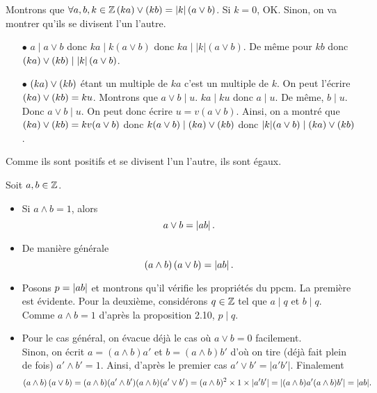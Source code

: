 \documentclass{magnolia}
\begin{document}
\begin{preuve}
Montrons que $\forall a,b,k\in\mathbb{Z}  \left(ka\right)\vee\left(kb\right)=\left|k\right|\left(a\vee b\right)$. Si $k=0$, OK. Sinon, on va montrer qu'ils se divisent l'un l'autre.
\begin{itemize}
\item[$\bullet$] $a\mid a\vee b$ donc $ka\mid k(a\vee b)$ donc $ka\mid |k|(a\vee b)$. De même pour $kb$ donc $\left(ka\right)\vee\left(kb\right)\mid \left|k\right|\left(a\vee b\right)$.
\item[$\bullet$] $\left(ka\right)\vee\left(kb\right)$ étant un multiple de $ka$ c'est un multiple de $k$. On peut l'écrire $\left(ka\right)\vee\left(kb\right)=ku$. Montrons que $a\vee b \mid u$. $ka\mid ku$ donc $a\mid u$. De même, $b\mid u$. Donc $a\vee b \mid u$. On peut donc écrire $u=v(a\vee b)$. Ainsi, on a montré que $\left(ka\right)\vee\left(kb\right)=kv(a\vee b)$ donc $k(a\vee b) \mid \left(ka\right)\vee\left(kb\right)$ donc $|k|(a\vee b) \mid \left(ka\right)\vee\left(kb\right)$.
\end{itemize}
Comme ils sont positifs et se divisent l'un l'autre, ils sont égaux.
\end{preuve}

\begin{proposition}
Soit $a,b\in\mathbb{Z}$.
\begin{itemize}
\item Si $a\wedge b=1$, alors
  \[a\vee b=\left|ab\right|.\]
\item De manière générale
  \[\left(a\wedge b\right)\left(a\vee b\right)=\left|ab\right|.\]
\end{itemize}
\end{proposition}

\begin{preuve}
\begin{itemize}
\item Posons $p=\left|ab\right|$ et montrons qu'il vérifie les propriétés du ppcm. La première est évidente. Pour la deuxième, considérons $q\in \mathbb{Z}$ tel que $a\mid q$ et $b\mid q$. Comme $a\wedge b=1$ d'après la proposition 2.10, $p\mid q$.
\item Pour le cas général, on évacue déjà le cas où $a\vee b=0$ facilement.\\
Sinon, on écrit $a=(a\wedge b)a'$ et $b=(a\wedge b)b'$ d'où on tire (déjà fait plein de fois) $a'\wedge b'=1$. Ainsi, d'après le premier cas $a'\vee b'=|a'b'|$. Finalement $$\left(a\wedge b\right)\left(a\vee b\right)=(a\wedge b)(a'\wedge b')(a\wedge b)(a'\vee b')=(a\wedge b)^2\times 1 \times |a'b'|=|(a\wedge b)a'(a\wedge b)b'|=|ab|.$$
\end{itemize}
\end{preuve}
\end{document}
